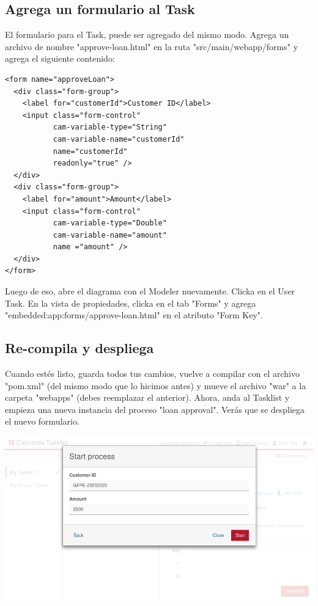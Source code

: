 \documentclass{article}
\begin{document}
\subsection{Agrega un formulario al Task}

El formulario para el Task, puede ser agregado del mismo modo. Agrega un archivo de nombre "approve-loan.html" en la ruta "src/main/webapp/forms" y agrega el siguiente contenido:

\begin{verbatim}
<form name="approveLoan">
  <div class="form-group">
    <label for="customerId">Customer ID</label>
    <input class="form-control"
           cam-variable-type="String"
           cam-variable-name="customerId"
           name="customerId"
           readonly="true" />
  </div>
  <div class="form-group">
    <label for="amount">Amount</label>
    <input class="form-control"
           cam-variable-type="Double"
           cam-variable-name="amount"
           name ="amount" />
  </div>
</form>
\end{verbatim}

Luego de eso, abre el diagrama con el Modeler nuevamente. Clicka en el User Task. En la vista de propiedades, clicka en el tab "Forms" y agrega "embedded:app:forms/approve-loan.html" en el atributo "Form Key".

\subsection{Re-compila y despliega}

Cuando estés listo, guarda todos tus cambios, vuelve a compilar con el archivo "pom.xml" (del mismo modo que lo hicimos antes) y mueve el archivo "war" a la carpeta "webapps" (debes reemplazar el anterior).
Ahora, anda al Tasklist y empieza una nueva instancia del proceso "loan approval". Verás que se despliega el nuevo formulario.

\begin{center}
\includegraphics[width=\textwidth]{start-form-embedded.png}
\end{center}
\end{document}
